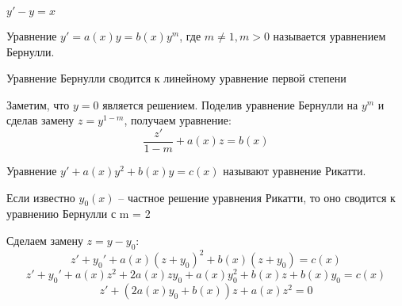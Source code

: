 \documentclass[document.tex]{subfiles}
\begin{document}
\begin{Example}
$y' - y = x$
\end{Example}
\begin{Definition}
Уравнение $y' = a(x)y = b(x)y^m$, где $m \neq 1, m > 0$ называется уравнением Бернулли.
\end{Definition}
\begin{Statement}
Уравнение Бернулли сводится к линейному уравнение первой степени
\end{Statement}
\begin{Proof}
Заметим, что $y = 0$ является решением. Поделив уравнение Бернулли на $y^m$ и сделав замену $z = y^{1-m}$, получаем уравнение:
$$\frac{z'}{1-m} + a(x)z = b(x)$$
\end{Proof}
\begin{Definition}
Уравнение $y' + a(x)y^2 + b(x)y = c(x)$ называют уравнение Рикатти.
\end{Definition}
\begin{Statement}
Если известно $y_0(x)$ -- частное решение уравнения Рикатти, то оно сводится к уравнению Бернулли с m = 2
\end{Statement}
\begin{Proof}
Сделаем замену $z = y - y_0$:
$$z' + y_0' + a(x)(z+y_0)^2 + b(x)(z+y_0) = c(x)$$
$$z' + y_0' + a(x)z^2 + 2a(x)zy_0 + a(x)y_0^2 + b(x)z + b(x)y_0 = c(x)$$
$$z' + (2a(x)y_0 + b(x))z + a(x)z^2 = 0$$
\end{Proof}
\end{document}
